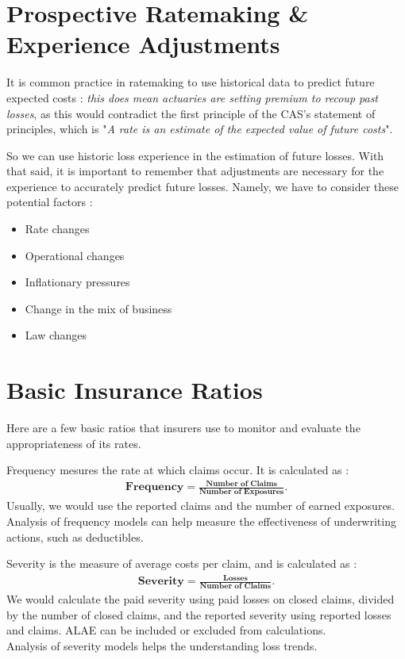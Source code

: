 \documentclass[11pt, english]{memoir}
\numberwithin{definition}{section}
\begin{document}
	
	\section{Prospective Ratemaking \& Experience Adjustments}
	It is common practice in ratemaking to use historical data to predict future expected costs : \emph{this does mean actuaries are setting premium to recoup past losses}, as this would contradict the first principle of the CAS's statement of principles, which is "\emph{A rate is an estimate of the expected value of future costs}".
	
	So we can use historic loss experience in the estimation of future losses. With that said, it is important to remember that adjustments are necessary for the experience to accurately  predict future losses. Namely, we have to consider these potential factors : 
	\begin{itemize}
		\item Rate changes
		\item Operational changes 
		\item Inflationary pressures 
		\item Change in the mix of business
		\item Law changes
	\end{itemize}
	
	
	
	\section{Basic Insurance Ratios}
	Here are a few basic ratios that insurers use to monitor and evaluate the appropriateness of its rates. 
	
	
	\begin{tcolorbox}[adjusted title = \textbf{Frequency}, bottomrule = 0mm, leftrule = 0mm, rightrule = 0mm, toprule = 0mm]
		Frequency mesures the rate at which claims occur. It is calculated as :
		\begin{align*}
		\textbf{Frequency} = \frac{\textbf{Number of Claims}}{\textbf{Number of Exposures}}.
		\end{align*}
		Usually, we would use the reported claims and the number of earned exposures. Analysis of frequency models can help measure the effectiveness of underwriting actions, such as deductibles. 
	\end{tcolorbox}
	
	
	\begin{tcolorbox}[adjusted title = \textbf{Severity}, boxrule = 0mm]
		Severity is the measure of average costs per claim, and is calculated as : 
		\begin{align*}
		\textbf{Severity} = \frac{\textbf{Losses}}{\textbf{Number of Claims}}.
		\end{align*}
		We would calculate the paid severity using paid losses on closed claims, divided by the number of closed claims, and the reported severity using reported losses and claims. ALAE can be included or excluded from calculations. \\
		
		Analysis of severity models helps the understanding loss trends. 
	\end{tcolorbox}
	
\end{document}
